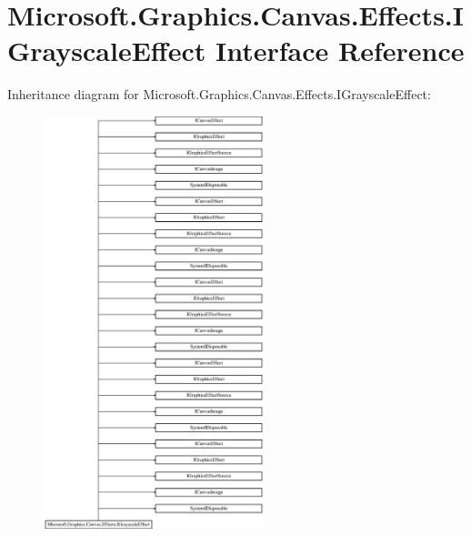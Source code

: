 \hypertarget{interface_microsoft_1_1_graphics_1_1_canvas_1_1_effects_1_1_i_grayscale_effect}{}\section{Microsoft.\+Graphics.\+Canvas.\+Effects.\+I\+Grayscale\+Effect Interface Reference}
\label{interface_microsoft_1_1_graphics_1_1_canvas_1_1_effects_1_1_i_grayscale_effect}
Inheritance diagram for Microsoft.\+Graphics.\+Canvas.\+Effects.\+I\+Grayscale\+Effect\+:\begin{figure}[H]
\begin{center}
\leavevmode
\includegraphics[height=12.000000cm]{interface_microsoft_1_1_graphics_1_1_canvas_1_1_effects_1_1_i_grayscale_effect}
\end{center}
\end{figure}
